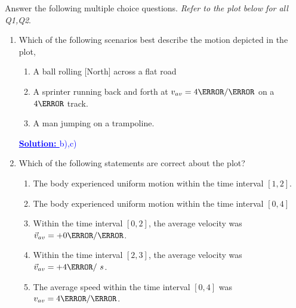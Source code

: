 \documentclass[12pt]{article} %
\newcommand{\tx}[1]{\text{#1}}
\begin{document}
\begin{qstn}[2]
Answer the following multiple choice questions. \emph{Refer to the plot below for all Q1,Q2}.
		\begin{center}
		\end{center}
	\begin{enumerate}
		\item Which of the following scenarios best describe the motion depicted in the plot,

			\begin{enumerate}[label = (\alph*)]
				\item A ball rolling [North] across a flat road
				\item A sprinter running back and forth at $v_{av} = 4 \m / \s$ on a $4\m$ track.
				\item A man jumping on a trampoline.
			\end{enumerate}
			\textcolor{blue}{\textbf{\underline{Solution: }} b),c)}


		\item Which of the following statements are correct about the plot?
			\begin{enumerate}[label = (\alph*)]
				\item The body experienced uniform motion within the time interval $[1,2]$.
				\item The body experienced uniform motion within the time interval $[0,4]$
				\item Within the time interval $[0,2]$, the average velocity was $\vec v_{av} = +0 \m / \s$.
				\item Within the time interval $[2,3]$, the average velocity was $\vec v_{av} = +4 \m / \ s$.
				\item The average speed within the time interval $[0,4]$ was $v_{av} = 4 \m / \s$.
			\end{enumerate}


\end{enumerate}
\end{qstn}
\end{document}
